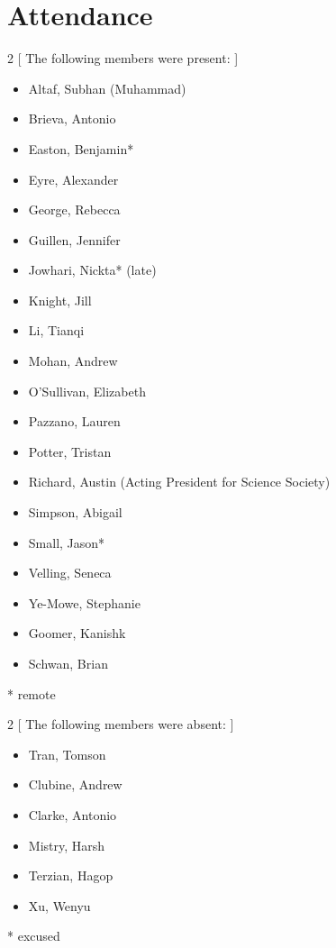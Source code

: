 \section*{Attendance}

\begin{multicols}{2}
    [
        The following members were present:
    ]
\begin{itemize}

    \item Altaf, Subhan (Muhammad)
    \item Brieva, Antonio
    \item Easton, Benjamin*
    \item Eyre, Alexander
    \item George, Rebecca
    \item Guillen, Jennifer
    \item Jowhari, Nickta*  (late)
    \item Knight, Jill
    \item Li, Tianqi
    \item Mohan, Andrew
    \item O'Sullivan, Elizabeth
    \item Pazzano, Lauren 
    \item Potter, Tristan
    \item Richard, Austin  (Acting President for Science Society)
    \item Simpson, Abigail
    \item Small, Jason*
    \item Velling, Seneca
    \item Ye-Mowe, Stephanie
    \item Goomer, Kanishk
    \item Schwan, Brian

\end{itemize}

\end{multicols}
* remote \\

\begin{multicols}{2}
    [
        The following members were absent:
    ]
\begin{itemize}

    \item Tran, Tomson
    \item Clubine, Andrew
    \item Clarke, Antonio
    \item Mistry, Harsh
    \item Terzian, Hagop
    \item Xu, Wenyu

\end{itemize}
\end{multicols}
* excused\\



